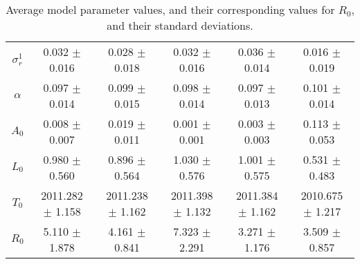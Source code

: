 \begin{sidewaystable}
\begin{tabular}{cccccc}
{\bf $\sigma^1_r$} & 0.032 $\pm$ 0.016 & 0.028 $\pm$ 0.018 & 0.032 $\pm$ 0.016 & 0.036 $\pm$ 0.014 & 0.016 $\pm$ 0.019 \\
{\bf $\alpha$} & 0.097 $\pm$ 0.014 & 0.099 $\pm$ 0.015 & 0.098 $\pm$ 0.014 & 0.097 $\pm$ 0.013 & 0.101 $\pm$ 0.014 \\
{\bf $A_0$} & 0.008 $\pm$ 0.007 & 0.019 $\pm$ 0.011 & 0.001 $\pm$ 0.001 & 0.003 $\pm$ 0.003 & 0.113 $\pm$ 0.053 \\
{\bf $L_0$} & 0.980 $\pm$ 0.560 & 0.896 $\pm$ 0.564 & 1.030 $\pm$ 0.576 & 1.001 $\pm$ 0.575 & 0.531 $\pm$ 0.483 \\
{\bf $T_0$} & 2011.282 $\pm$ 1.158 & 2011.238 $\pm$ 1.162 & 2011.398 $\pm$ 1.132 & 2011.384 $\pm$ 1.162 & 2010.675 $\pm$ 1.217 \\
{\bf $R_0$} & 5.110 $\pm$ 1.878& 4.161 $\pm$ 0.841& 7.323 $\pm$ 2.291& 3.271 $\pm$ 1.176& 3.509 $\pm$ 0.857\\
\hline\hline
\end{tabular}
\caption{Average model parameter values, and their corresponding values for $R_0$,  and their standard deviations.}
\label{Table:Parameter_Values}
\end{sidewaystable}

